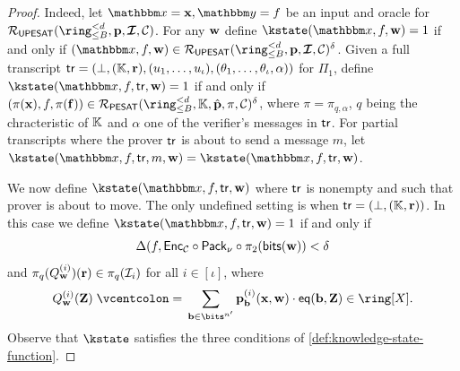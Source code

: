 \documentclass[11pt,letterpaper,usenames,dvipsnames]{article}
\begin{document}
\begin{proof}
    Indeed, let $\inp=\xx, \oracle=f$ be an input and oracle for $\PIMSAT(\ringtwobounds{B}{\moduledegree}, \pp,\bm{\ideal}, \cC)$. For any $\mathbf{w}$ define $\kstate(\inp,f, \ww)=1$ if and only if $(\inp,f,\ww)\in \PIMSAT(\ringtwobounds{B}{\moduledegree}, \pp,\bm{\ideal}, \cC)^\delta$. Given a full transcript $\mathsf{tr}=(\bot, (\mathbb{K},\mathbf{r}),  (u_1,\ldots, u_\iota),(\theta_1,\ldots, \theta_\iota, \alpha))$ for $\Pi_{1}$, define $\kstate(\inp, f, \tr, \ww) = 1$ if and only if $(\pi(\xx), f, \pi(\bff))\in \PESAT(\ringtwobounds{B}{\moduledegree}, \KK, \hat{\pp},  \pi, \cC)^\delta$, where $\pi=\pi_{q,\alpha}$, $q$ being the chracteristic of $\mathbb{K}$ and $\alpha$ one of the verifier's messages in $\mathsf{tr}$. For partial transcripts where the prover $\mathsf{tr}$ is about to send a message $m$, let $\kstate(\inp,f,\tr, m, \ww) = \kstate(\inp, f,\tr,\ww)$. 

    We now define  $\kstate(\inp, f, \tr, \ww)$ where $\mathsf{tr}$ is nonempty and such that prover is about to move.  The only undefined setting is when $\mathsf{tr}=(\bot, (\mathbb{K},\mathbf{r}))$. In this case we define $\kstate(\inp, f, \tr, \ww) = 1$ if and only if $$\Delta(f,\mathsf{Enc}_{\mathcal{C}}\circ \mathsf{Pack}_\nu \circ \pi_2(\mathsf{bits}(\mathbf{w})) < \delta$$ and $\pi_q(Q_{\mathbf{w}}^{(i)})(\mathbf{r})\in \pi_q(\mathcal{I}_i)$ for all $i\in [\iota]$,  where 
    $$
    Q_{\ww}^{(i)}(\mathbf{Z})\defeq\sum_{\bb\in\bits^{n'}}\pp_{\bb}^{(i)}(\xx,\ww) \cdot \eq(\bb, \mathbf{Z}) \in \ring[X]. 
$$
%
Observe that $\kstate$ satisfies the three conditions of \cref{def:knowledge-state-function}.

      


\end{proof}
\end{document}
